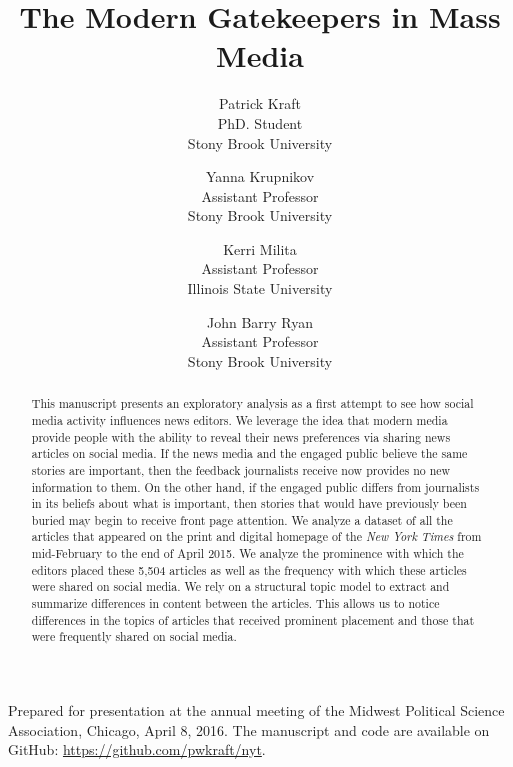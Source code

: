 \documentclass[12pt]{article}
\title{The Modern Gatekeepers in Mass Media}
\author{Patrick Kraft\\PhD. Student\\Stony Brook University \and Yanna Krupnikov\\Assistant Professor\\Stony Brook University \and Kerri Milita\\Assistant Professor\\Illinois State University \and John Barry Ryan\\Assistant Professor\\Stony Brook University}
\begin{document}
\maketitle\thispagestyle{empty}

\begin{abstract}
This manuscript presents an exploratory analysis as a first attempt to see how social media activity influences news editors. We leverage the idea that modern media provide people with the ability to reveal their news preferences via sharing news articles on social media. If the news media and the engaged public believe the same stories are important, then the feedback journalists receive now provides no new information to them. On the other hand, if the engaged public differs from journalists in its beliefs about what is important, then stories that would have previously been buried may begin to receive front page attention. We analyze a dataset of all the articles that appeared on the print and digital homepage of the \textit{New York Times} from mid-February to the end of April 2015. We analyze the prominence with which the editors placed these 5,504 articles as well as the frequency with which these articles were shared on social media. We rely on a structural topic model to extract and summarize differences in content between the articles. This allows us to notice differences in the topics of articles that received prominent placement and those that were frequently shared on social media.
\end{abstract}

\bigskip
Prepared for presentation at the annual meeting of the Midwest Political Science Association, Chicago, April 8, 2016. The manuscript and code are available on GitHub: \url{https://github.com/pwkraft/nyt}.
\end{document}
